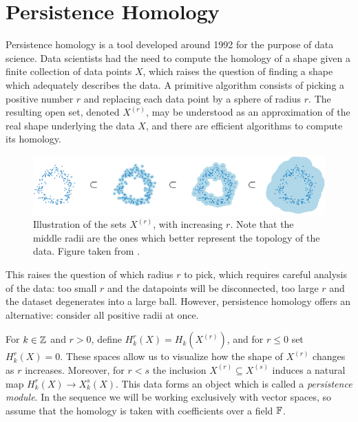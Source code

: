 
\section{Persistence Homology}

\nocite{polterovich}

Persistence homology is a tool developed around 1992 for the purpose of data science. Data scientists had the need to compute the homology of a shape given a finite collection of data points $X$, which raises the question of finding a shape which adequately describes the data. A primitive algorithm consists of picking a positive number $r$ and replacing each data point by a sphere of radius $r$. The resulting open set, denoted $X^{(r)}$, may be understood as an approximation of the real shape underlying the data $X$, and there are efficient algorithms to compute its homology.

\begin{figure}
\centering
\includegraphics[width=\linewidth]{data}
\caption{Illustration of the sets $X^{(r)}$, with increasing $r$. Note that the middle radii are the ones which better represent the topology of the data. Figure taken from \cite{historypersistence}.}
\end{figure}

This raises the question of which radius $r$ to pick, which requires careful analysis of the data: too small $r$ and the datapoints will be disconnected, too large $r$ and the dataset degenerates into a large ball. However, persistence homology offers an alternative: consider all positive radii at once.

For $k \in \mathbb{Z}$ and $r > 0$, define $H_k^r(X) = H_k(X^{(r)})$, and for $r \leq 0$ set $H_k^r(X) = 0$. These spaces allow us to visualize how the shape of $X^{(r)}$ changes as $r$ increases. Moreover, for $r < s$ the inclusion $X^{(r)} \subseteq X^{(s)}$ induces a natural map $H_k^r(X) \to X_k^s(X)$. This data forms an object which is called a \emph{persistence module}. In the sequence we will be working exclusively with vector spaces, so assume that the homology is taken with coefficients over a field $\mathbb{F}$.


